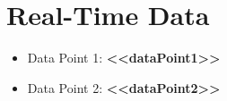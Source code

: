 \documentclass{article}
\begin{document}
\section{Real-Time Data}
\begin{itemize}
    \item Data Point 1: \textbf{<<dataPoint1>>}
    \item Data Point 2: \textbf{<<dataPoint2>>}
\end{itemize}
\end{document}
